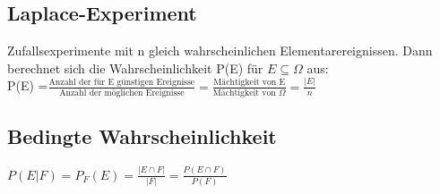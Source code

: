   \subsection{Laplace-Experiment}
  Zufallsexperimente mit n gleich wahrscheinlichen Elementarereignissen. Dann berechnet sich die Wahrscheinlichkeit P(E) für $E \subseteq \Omega$ aus:\\
  P(E) =$\frac{\text{Anzahl der für E günstigen Ereignisse}}{\text{Anzahl der möglichen Ereignisse}} = \frac{\text{Mächtigkeit von E}}{\text{Mächtigkeit von } \Omega} = \frac{|E|}{n}$
  \subsection{Bedingte Wahrscheinlichkeit}
  $P(E|F) = P_{F}(E) = \frac{|E \cap F| }{|F|} = \frac{P(E\cap F)}{P(F)}$
